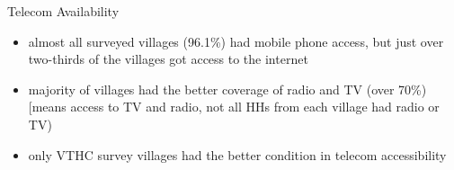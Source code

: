 \documentclass[
  ignorenonframetext,
]{beamer}
\providecommand{\tightlist}{%
  \setlength{\itemsep}{0pt}\setlength{\parskip}{0pt}}
\begin{document}
\begin{frame}{Telecom Availability}
\protect\hypertarget{telecom-availability}{}
\begin{itemize}
\tightlist
\item
  almost all surveyed villages (96.1\%) had mobile phone access, but
  just over two-thirds of the villages got access to the internet
\item
  majority of villages had the better coverage of radio and TV (over
  70\%) {[}means access to TV and radio, not all HHs from each village
  had radio or TV)
\item
  only VTHC survey villages had the better condition in telecom
  accessibility
\end{itemize}
\end{frame}
\end{document}
